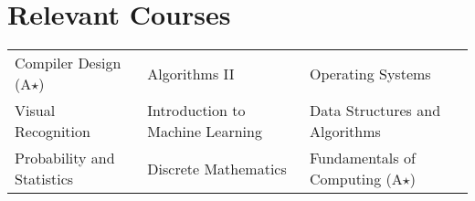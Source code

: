 \section*{Relevant Courses}
\vspace{-1mm}
\begin{tabularx}{\textwidth}{X X X}
    Compiler Design (A$\star$) &
    Algorithms II &
    Operating Systems \\
    Visual Recognition &
    Introduction to Machine Learning &
    Data Structures and Algorithms \\
    Probability and Statistics &
    Discrete Mathematics &
    Fundamentals of Computing (A$\star$)
\end{tabularx}
